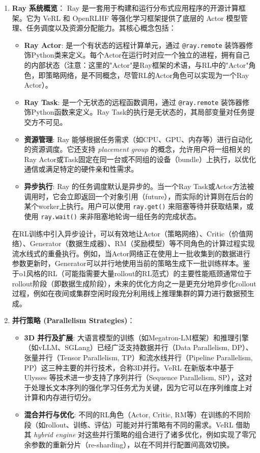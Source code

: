 \documentclass{pkuthesis}
\begin{document}
\begin{enumerate}
    \item \textbf{Ray 系统概览}：
    Ray 是一套用于构建和运行分布式应用程序的开源计算框架。它为 VeRL 和 OpenRLHF 等强化学习框架提供了底层的 Actor 模型管理、任务调度以及资源分配能力。其核心概念包括：
    \begin{itemize}
        \item \textbf{Ray Actor}: 是一个有状态的远程计算单元，通过 \texttt{@ray.remote} 装饰器修饰Python类来定义。每个Actor在运行时对应一个独立的进程，拥有自己的内部状态（注意：这里的"Actor"是Ray框架的术语，与RL中的"Actor"角色，即策略网络，是不同概念，尽管RL的Actor角色可以实现为一个Ray Actor）。
        \item \textbf{Ray Task}: 是一个无状态的远程函数调用，通过 \texttt{@ray.remote} 装饰器修饰Python函数来定义。Ray Task的执行是无状态的，其局部变量对任务提交方不可见。
        \item \textbf{资源管理}: Ray 能够根据任务需求（如CPU、GPU、内存等）进行自动化的资源调度。它还支持 \textit{placement group} 的概念，允许用户将一组相关的Ray Actor或Task固定在同一台或不同组的设备（bundle）上执行，以优化通信或满足特定的硬件亲和性需求。
        \item \textbf{异步执行}: Ray 的任务调度默认是异步的。当一个Ray Task或Actor方法被调用时，它会立即返回一个对象引用（future），而实际的计算则在后台的某个worker上执行。用户可以使用 \texttt{ray.get()} 来阻塞等待并获取结果，或使用 \texttt{ray.wait()} 来非阻塞地轮询一组任务的完成状态。
    \end{itemize}
    在RL训练中引入异步设计，可以有效地让Actor（策略网络）、Critic（价值网络）、Generator（数据生成器）、RM（奖励模型）等不同角色的计算过程实现流水线式的重叠执行。例如，当Actor网络正在使用上一批收集到的数据进行参数更新时，Generator可以并行地使用当前的策略生成下一批训练样本。鉴于o1风格的RL（可能指需要大量rollout的RL范式）的主要性能瓶颈通常位于rollout阶段（即数据生成阶段），未来的优化方向之一是更充分地异步化rollout过程，例如在夜间或集群空闲时段充分利用线上推理集群的算力进行数据预生成。

    \item \textbf{并行策略 (Parallelism Strategies)}：
    \begin{itemize}
        \item \textbf{3D 并行及扩展}: 大语言模型的训练（如Megatron-LM框架）和推理引擎（如vLLM、SGLang）已经广泛支持数据并行（Data Parallelism, DP）、张量并行（Tensor Parallelism, TP）和流水线并行（Pipeline Parallelism, PP）这三种主要的并行技术，合称3D并行。VeRL 在新版本中基于 Ulysses 等技术进一步支持了序列并行（Sequence Parallelism, SP），这对于处理长文本序列的强化学习任务尤为关键，因为它可以在序列维度上对计算和内存进行切分。
        \item \textbf{混合并行与优化}: 不同的RL角色（Actor, Critic, RM等）在训练的不同阶段（如rollout、训练、评估）可能对并行策略有不同的需求。VeRL 借助其 \emph{hybrid engine} 对这些并行策略的组合进行了诸多优化，例如实现了零冗余参数的重新分片（re-sharding），以在不同并行配置间高效切换。
    \end{itemize}



\end{enumerate}
\end{document}
